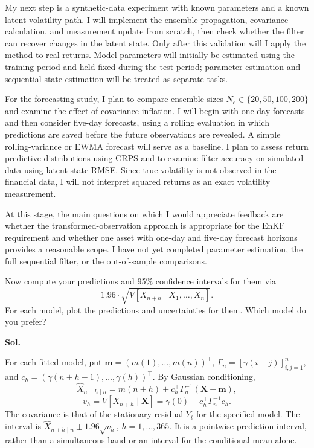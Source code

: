 \documentclass[lang=en,11pt,a4paper,citestyle =authoryear,nobib=true]{elegantpaper}
\begin{document}
My next step is a synthetic-data experiment with known parameters
and a known latent volatility path. I will implement the ensemble
propagation, covariance calculation, and measurement update from
scratch, then check whether the filter can recover changes in the
latent state. Only after this validation will I apply the method to
real returns. Model parameters will initially be estimated using
the training period and held fixed during the test period; parameter
estimation and sequential state estimation will be treated as
separate tasks.

For the forecasting study, I plan to compare ensemble sizes
$N_e\in\{20,50,100,200\}$ and examine the effect of covariance
inflation. I will begin with one-day forecasts and then consider
five-day forecasts, using a rolling evaluation in which predictions
are saved before the future observations are revealed. A simple
rolling-variance or EWMA forecast will serve as a baseline. I plan
to assess return predictive distributions using CRPS and to examine
filter accuracy on simulated data using latent-state RMSE. Since
true volatility is not observed in the financial data, I will not
interpret squared returns as an exact volatility measurement.

At this stage, the main questions on which I would appreciate
feedback are whether the transformed-observation approach is
appropriate for the EnKF requirement and whether one asset with
one-day and five-day forecast horizons provides a reasonable scope.
I have not yet completed parameter estimation, the full sequential
filter, or the out-of-sample comparisons.

\vspace{1em}

\newpage
\item Now compute your predictions and 95\% confidence intervals for them
via
\[
1.96\cdot\sqrt{V[X_{n+h}\mid X_1,\ldots,X_n]}.
\]
For each model, plot the predictions and uncertainties for them.
Which model do you prefer?

\par\vspace{0.5em}\noindent\textbf{Sol.}\par
For each fitted model, put $\mathbf m=(m(1),\ldots,m(n))^\top$,
$\Gamma_n=[\gamma(i-j)]_{i,j=1}^n$, and
$c_h=(\gamma(n+h-1),\ldots,\gamma(h))^\top$. By Gaussian conditioning,
\[
\widehat X_{n+h\mid n}=m(n+h)+c_h^\top\Gamma_n^{-1}(\mathbf X-\mathbf m),
\]
\[
v_h=V[X_{n+h}\mid\mathbf X]=\gamma(0)-c_h^\top\Gamma_n^{-1}c_h.
\]
The covariance is that of the stationary residual $Y_t$ for the specified
model. The interval is
$\widehat X_{n+h\mid n}\pm1.96\sqrt{v_h}$, $h=1,\ldots,365$.
It is a pointwise prediction interval, rather than a simultaneous band
or an interval for the conditional mean alone.
\end{document}
